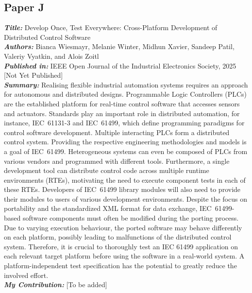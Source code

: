 \subsection{Paper J}
\textbf{\textit{Title:}} Develop Once, Test Everywhere: Cross-Platform Development of Distributed Control Software\\
\textbf{\textit{Authors:}} Bianca Wiesmayr, Melanie Winter, Midhun Xavier, Sandeep Patil, Valeriy Vyatkin, and Alois Zoitl\\
\textbf{\textit{Published in:}} IEEE Open Journal of the Industrial Electronics Society, 2025 [Not Yet Published]\\
\textbf{\textit{Summary:}} Realising flexible industrial automation systems requires an approach for autonomous and distributed designs. Programmable Logic Controllers (PLCs) are the established platform for real-time control software that accesses sensors and actuators. Standards play an important role in distributed automation, for instance, IEC~61131-3 and IEC~61499, which define programming paradigms for control software development. Multiple interacting PLCs form a distributed control system. Providing the respective engineering methodologies and models is a goal of IEC~61499. Heterogeneous systems can even be composed of PLCs from various vendors and programmed with different tools. Furthermore, a single development tool can distribute control code across multiple runtime environments (RTEs), motivating the need to execute component tests in each of these RTEs. Developers of IEC~61499 library modules will also need to provide their modules to users of various development environments. Despite the focus on portability and the standardized XML format for data exchange, IEC~61499-based software components must often be modified during the porting process. Due to varying execution behaviour, the ported software may behave differently on each platform, possibly leading to malfunctions of the distributed control system. Therefore, it is crucial to thoroughly test an IEC 61499 application on each relevant target platform before using the software in a real-world system. A platform-independent test specification has the potential to greatly reduce the involved effort.\\
\textbf{\textit{My Contribution:}} [To be added]

